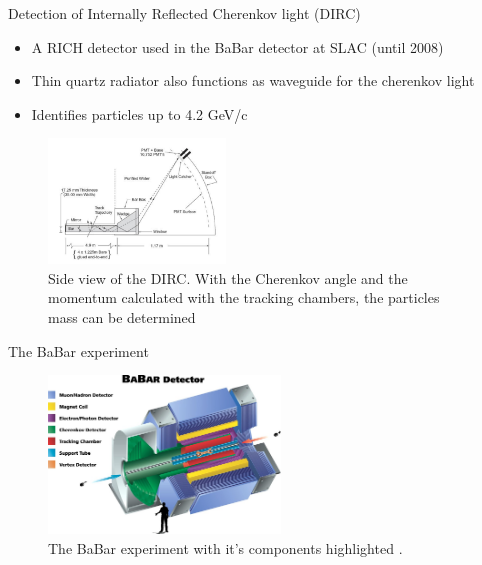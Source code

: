 \documentclass[aspectratio=1610, 10pt]{beamer}
\begin{document}
\begin{frame}{Detection of Internally Reflected Cherenkov light (DIRC)}
  \begin{itemize}
    \item A RICH detector used in the BaBar detector at SLAC (until 2008)
    \medskip
    \item Thin quartz radiator also functions as waveguide for the cherenkov light
    \medskip
    \item Identifies particles up to 4.2 GeV/c
  \end{itemize}
  \begin{figure}
    \includegraphics[width=0.42\textwidth]{images/dirc.png}
    \caption{Side view of the DIRC. With the Cherenkov angle and the momentum calculated with the tracking chambers, the
    particles mass can be determined \cite{gaseous}}
  \end{figure}
\end{frame}

\begin{frame}{The BaBar experiment}
  \begin{figure}
    \includegraphics[width=0.55\textwidth]{images/babar.jpg}
    \caption{The BaBar experiment with it's components highlighted \cite{babar}.}
  \end{figure}
\end{frame}
\end{document}
